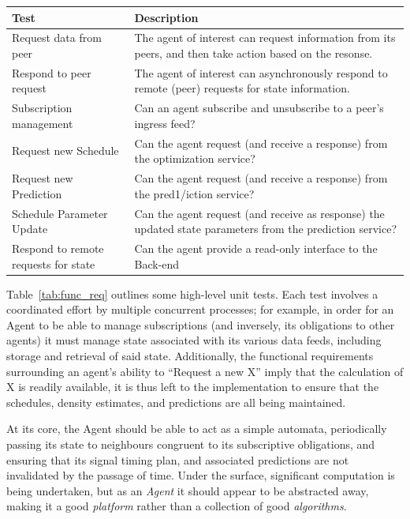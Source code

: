 \documentclass{report}
\begin{document}
\begin{longtable}[H]{| P{4cm} | P{10cm} |} 
\hline
    Test                                & Description                                                                                               \\ \hline
    [network] Request data from peer    & The agent of interest can request information from its peers, and then take action based on the resonse.  \\ \hline
    [network] Respond to peer request   & The agent of interest can asynchronously respond to remote (peer) requests for state information.         \\ \hline
    [network] Subscription management   & Can an agent subscribe and unsubscribe to a peer's ingress feed?                                          \\ \hline
    [opt] Request new Schedule          & Can the agent request (and receive a response)  from the optimization service?                            \\ \hline
    [predict] Request new Prediction    & Can the agent request (and receive a response) from the pred1/iction service?                               \\ \hline
    [predict] Schedule Parameter Update & Can the agent request (and receive as response) the updated state parameters from the prediction service? \\ \hline
    [data] Respond to remote requests for state & Can the agent provide a read-only interface to the Back-end\\ \hline
\end{longtable}\label{tab:func_req}

Table~\ref{tab:func_req} outlines some high-level unit tests.
Each test involves a coordinated effort by multiple concurrent processes; for example, in order for an Agent to be able to manage subscriptions (and inversely, its obligations to other agents) it must manage state associated with its various data feeds, including storage and retrieval of said state.
Additionally, the functional requirements surrounding an agent's ability to ``Request a new X'' imply that the calculation of X is readily available, it is thus left to the implementation to ensure that the schedules, density estimates, and predictions are all being maintained.

At its core, the Agent should be able to act as a simple automata, periodically passing its state to neighbours congruent to its subscriptive obligations, and ensuring that its signal timing plan, and associated predictions are not invalidated by the passage of time.
Under the surface, significant computation is being undertaken, but as an \emph{Agent} it should appear to be abstracted away, making it a good \emph{platform} rather than a collection of good \emph{algorithms}.
\end{document}
